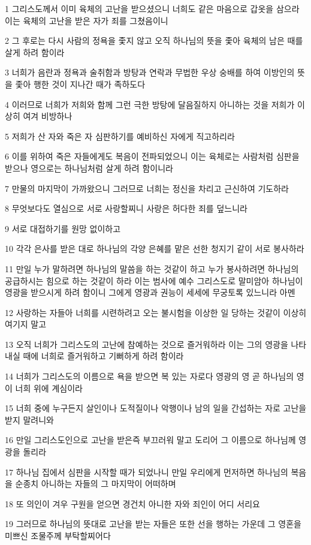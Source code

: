 \par 1 그리스도께서 이미 육체의 고난을 받으셨으니 너희도 같은 마음으로 갑옷을 삼으라 이는 육체의 고난을 받은 자가 죄를 그쳤음이니
\par 2 그 후로는 다시 사람의 정욕을 좇지 않고 오직 하나님의 뜻을 좇아 육체의 남은 때를 살게 하려 함이라
\par 3 너희가 음란과 정욕과 술취함과 방탕과 연락과 무법한 우상 숭배를 하여 이방인의 뜻을 좇아 행한 것이 지나간 때가 족하도다
\par 4 이러므로 너희가 저희와 함께 그런 극한 방탕에 달음질하지 아니하는 것을 저희가 이상히 여겨 비방하나
\par 5 저희가 산 자와 죽은 자 심판하기를 예비하신 자에게 직고하리라
\par 6 이를 위하여 죽은 자들에게도 복음이 전파되었으니 이는 육체로는 사람처럼 심판을 받으나 영으로는 하나님처럼 살게 하려 함이니라
\par 7 만물의 마지막이 가까왔으니 그러므로 너희는 정신을 차리고 근신하여 기도하라
\par 8 무엇보다도 열심으로 서로 사랑할찌니 사랑은 허다한 죄를 덮느니라
\par 9 서로 대접하기를 원망 없이하고
\par 10 각각 은사를 받은 대로 하나님의 각양 은혜를 맡은 선한 청지기 같이 서로 봉사하라
\par 11 만일 누가 말하려면 하나님의 말씀을 하는 것같이 하고 누가 봉사하려면 하나님의 공급하시는 힘으로 하는 것같이 하라 이는 범사에 예수 그리스도로 말미암아 하나님이 영광을 받으시게 하려 함이니 그에게 영광과 권능이 세세에 무궁토록 있느니라 아멘
\par 12 사랑하는 자들아 너희를 시련하려고 오는 불시험을 이상한 일 당하는 것같이 이상히 여기지 말고
\par 13 오직 너희가 그리스도의 고난에 참예하는 것으로 즐거워하라 이는 그의 영광을 나타내실 때에 너희로 즐거워하고 기뻐하게 하려 함이라
\par 14 너희가 그리스도의 이름으로 욕을 받으면 복 있는 자로다 영광의 영 곧 하나님의 영이 너희 위에 계심이라
\par 15 너희 중에 누구든지 살인이나 도적질이나 악행이나 남의 일을 간섭하는 자로 고난을 받지 말려니와
\par 16 만일 그리스도인으로 고난을 받은즉 부끄러워 말고 도리어 그 이름으로 하나님께 영광을 돌리라
\par 17 하나님 집에서 심판을 시작할 때가 되었나니 만일 우리에게 먼저하면 하나님의 복음을 순종치 아니하는 자들의 그 마지막이 어떠하며
\par 18 또 의인이 겨우 구원을 얻으면 경건치 아니한 자와 죄인이 어디 서리요
\par 19 그러므로 하나님의 뜻대로 고난을 받는 자들은 또한 선을 행하는 가운데 그 영혼을 미쁘신 조물주께 부탁할찌어다

